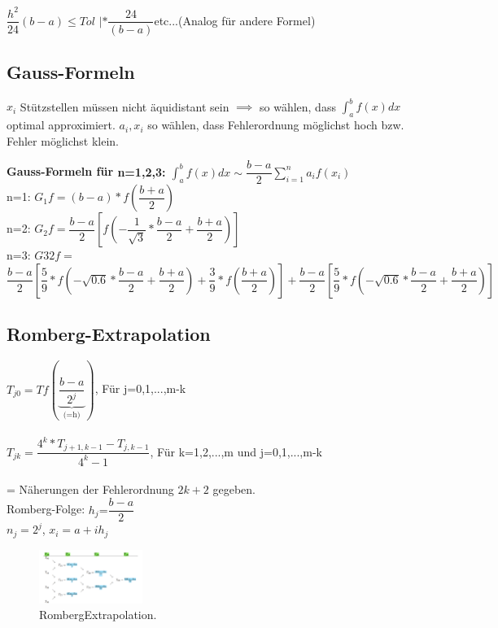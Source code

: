 \documentclass[../ZF_HM2.tex]{subfiles}
\begin{document}
$\dfrac{h^2}{24}(b-a)\leq Tol$      $|*\dfrac{24}{(b-a)} $etc...(Analog für andere Formel)\\

\subsection{Gauss-Formeln}
$x_i$ Stützstellen müssen nicht äquidistant sein $\implies$ so wählen, dass $\int_a^bf(x)dx$ optimal approximiert. $a_i,x_i$ so wählen, dass Fehlerordnung möglichst hoch bzw. Fehler möglichst klein.
\begin{mdframed}
	\textbf{Gauss-Formeln für \colorbox{blue!30}{n=1,2,3: $\int_a^bf(x)dx\sim \dfrac{b-a}{2}\sum_{i=1}^{n}a_i f(x_i)$}}\\
	\colorbox{violet!30}{n=1: $G_1f =$}$(b-a)*f(\dfrac{b+a}{2})$\\
	\colorbox{green!30}{n=2: $G_2f =$}$\dfrac{b-a}{2}[f(-\dfrac{1}{\sqrt{3}}*\dfrac{b-a}{2}+ \dfrac{b+a}{2})]$\\
	\colorbox{orange!30}{n=3: $G32f =$}$\dfrac{b-a}{2}[\dfrac{5}{9}*f(-\sqrt{0.6}*\dfrac{b-a}{2}+\dfrac{b+a}{2})+\dfrac{3}{9}*f(\dfrac{b+a}{2})]+\dfrac{b-a}{2}[\dfrac{5}{9}*f(-\sqrt{0.6}*\dfrac{b-a}{2}+\dfrac{b+a}{2})]$

\end{mdframed}

\subsection{Romberg-Extrapolation}

\colorbox{orange!30}{$T_{j0}=$}$Tf(\underbrace{\dfrac{b-a}{2^j}}_\text{(=h)})$, Für j=0,1,...,m-k\\\\
\colorbox{orange!30}{$T_{jk}=$}$\dfrac{4^k*T_{j+1,k-1}-T_{j,k-1}}{4^k-1}$, Für k=1,2,...,m und j=0,1,...,m-k\\\\
= Näherungen der Fehlerordnung \colorbox{green!30}{$2k+2$} gegeben.\\
\colorbox{blue!30}{Romberg-Folge:} \colorbox{orange!30}{$h_j$=}$\dfrac{b-a}{2}$\\
$n_j=2^j$, $x_i= a+ih_j$\\
\begin{figure}[H]
\centering
\includegraphics[width=0.3\textwidth]{Resources/Images/RombergExtrapolation.png}
\caption{\label{fig:RombergExtrapolation}RombergExtrapolation.}
\end{figure}
\end{document}

